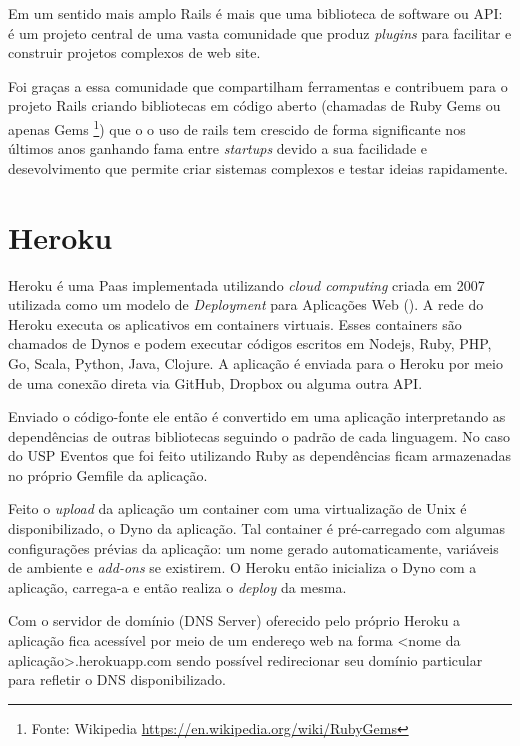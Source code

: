     \par Em um sentido mais amplo Rails é mais que uma biblioteca de software ou API: é um projeto central de uma vasta comunidade que produz \emph{plugins} para facilitar e construir projetos complexos de web site.
    \par Foi graças a essa comunidade que compartilham ferramentas e contribuem para o projeto Rails criando bibliotecas em código aberto (chamadas de Ruby Gems ou apenas Gems \footnote{Fonte: Wikipedia \url{https://en.wikipedia.org/wiki/RubyGems}}) que o o uso de rails tem crescido de forma significante nos últimos anos ganhando fama entre \emph{startups} devido a sua  facilidade e desevolvimento que permite criar sistemas complexos e testar ideias rapidamente.

\section{Heroku}
\par Heroku é uma Paas implementada utilizando \emph{cloud computing} criada em 2007 utilizada como um modelo de \emph{Deployment} para Aplicações Web (\cite{herokuwiki}). A rede do Heroku executa os aplicativos em containers virtuais. Esses containers são chamados de Dynos e podem executar códigos escritos em Nodejs, Ruby, PHP, Go, Scala, Python, Java, Clojure. A aplicação é enviada para o Heroku por meio de uma conexão direta via GitHub, Dropbox ou alguma outra API.
\par Enviado o código-fonte ele então é convertido em uma aplicação interpretando as dependências de outras bibliotecas seguindo o padrão de cada linguagem. No caso do USP Eventos que foi feito utilizando Ruby as dependências ficam armazenadas no próprio Gemfile da aplicação.
\par Feito o \emph{upload} da aplicação um container com uma virtualização de Unix é disponibilizado, o Dyno da aplicação. Tal container é pré-carregado com algumas configurações prévias da aplicação: um nome gerado automaticamente, variáveis de ambiente e \emph{add-ons} se existirem. O Heroku então inicializa o Dyno com a aplicação, carrega-a e então realiza o \emph{deploy} da mesma.
\par Com o servidor de domínio (DNS Server) oferecido pelo próprio Heroku a aplicação fica acessível por meio de um endereço web na forma <nome da aplicação>.herokuapp.com sendo possível redirecionar seu domínio particular para refletir o DNS disponibilizado.
